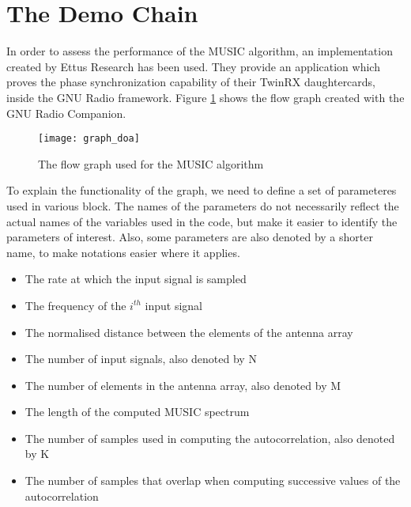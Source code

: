 
\section{The Demo Chain}
\label{sec:demo-chain}
In order to assess the performance of the MUSIC algorithm, an implementation
created by Ettus Research \cite{cite:ettus-doa} has been used. They provide an
application which proves the phase synchronization capability of their TwinRX
daughtercards, inside the GNU Radio framework. Figure \ref{fig:grc-fg} shows the
flow graph created with the GNU Radio Companion. \\

\begin{figure}[h]
    \centering
    \texttt{[image: graph\_doa]}
    \caption{The flow graph used for the MUSIC algorithm}
    \label{fig:grc-fg}
\end{figure}


To explain the functionality of the graph, we need to define a set of
parameteres used in various block. The names of the parameters do not
necessarily reflect the actual names of the variables used in the code, but make
it easier to identify the parameters of interest. Also, some parameters are also
denoted by a shorter name, to make notations easier where it applies.
\begin{itemize}
  \item {} The rate at which the input signal is sampled
  \item {} The frequency of the $i^{th}$ input signal
  \item {} The normalised distance between the elements of the
  antenna array
  \item {} The number of input signals, also denoted by N
  \item {} The number of elements in the antenna array,
  also denoted by M
  \item {} The length of the computed MUSIC spectrum
  \item {} The number of samples used in computing the
  autocorrelation, also denoted by K
  \item {} The number of samples that overlap when computing
  successive values of the autocorrelation
\end{itemize}

